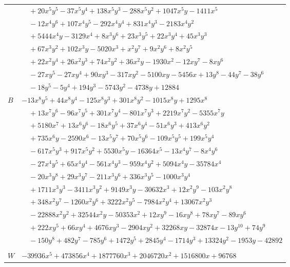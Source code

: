 \documentclass[11pt]{article}
\begin{document}
\begin{longtable}{@{}ll@{}}
 & $\quad +20x^{5}y^{5}-37x^{5}y^{4}+138x^{5}y^{3}-288x^{5}y^{2}+1047x^{5}y-1411x^{5}$\\
 & $\quad -12x^{4}y^{6}+107x^{4}y^{5}-292x^{4}y^{4}+831x^{4}y^{3}-2183x^{4}y^{2}$\\
 & $\quad +5444x^{4}y-3129x^{4}+8x^{3}y^{6}+23x^{3}y^{5}+22x^{3}y^{4}+45x^{3}y^{3}$\\
 & $\quad +67x^{3}y^{2}+102x^{3}y-5020x^{3}+x^{2}y^{7}+9x^{2}y^{6}+8x^{2}y^{5}$\\
 & $\quad +22x^{2}y^{4}+26x^{2}y^{3}+74x^{2}y^{2}+36x^{2}y-1930x^{2}-12xy^{7}-8xy^{6}$\\
 & $\quad -27xy^{5}-27xy^{4}+90xy^{3}-317xy^{2}-5100xy-5456x+13y^{8}-44y^{7}-38y^{6}$\\
 & $\quad -18y^{5}-5y^{4}+194y^{3}-5743y^{2}-4738y+12884$\\
$B$ & $-13x^{8}y^{5}+44x^{8}y^{4}-125x^{8}y^{3}+301x^{8}y^{2}-1015x^{8}y+1295x^{8}$\\
 & $\quad +13x^{7}y^{6}-96x^{7}y^{5}+301x^{7}y^{4}-801x^{7}y^{3}+2219x^{7}y^{2}-5355x^{7}y$\\
 & $\quad +5180x^{7}+13x^{6}y^{6}-18x^{6}y^{5}+37x^{6}y^{4}-51x^{6}y^{3}+413x^{6}y^{2}$\\
 & $\quad +735x^{6}y-2590x^{6}-13x^{5}y^{7}+70x^{5}y^{6}-109x^{5}y^{5}+199x^{5}y^{4}$\\
 & $\quad -617x^{5}y^{3}+917x^{5}y^{2}+5530x^{5}y-16364x^{5}-13x^{4}y^{7}-8x^{4}y^{6}$\\
 & $\quad -27x^{4}y^{5}+65x^{4}y^{4}-561x^{4}y^{3}-959x^{4}y^{2}+5094x^{4}y-35784x^{4}$\\
 & $\quad -20x^{3}y^{8}+29x^{3}y^{7}-211x^{3}y^{6}+336x^{3}y^{5}-1000x^{3}y^{4}$\\
 & $\quad +1711x^{3}y^{3}-3411x^{3}y^{2}+9149x^{3}y-30632x^{3}+12x^{2}y^{9}-103x^{2}y^{8}$\\
 & $\quad +348x^{2}y^{7}-1260x^{2}y^{6}+3222x^{2}y^{5}-7984x^{2}y^{4}+13067x^{2}y^{3}$\\
 & $\quad -22888x^{2}y^{2}+32544x^{2}y-50353x^{2}+12xy^{9}-16xy^{8}+78xy^{7}-89xy^{6}$\\
 & $\quad +222xy^{5}+66xy^{4}+4676xy^{3}-2904xy^{2}+32268xy-32874x-13y^{10}+74y^{9}$\\
 & $\quad -150y^{8}+482y^{7}-785y^{6}+1472y^{5}+2845y^{4}-1714y^{3}+13324y^{2}-1953y-42892$\\
\addlinespace[3pt]
\multicolumn{2}{@{}l}{$g=2$, $i=33$, $m=128$, neighbours $6,10,11,15,16,18,19,22,24,25,27,31,32,34,37,40,41$}\\
$W$ & $-39936x^{5}+473856x^{4}+1877760x^{3}+2046720x^{2}+1516800x+96768$\\

\end{longtable}
\end{document}
